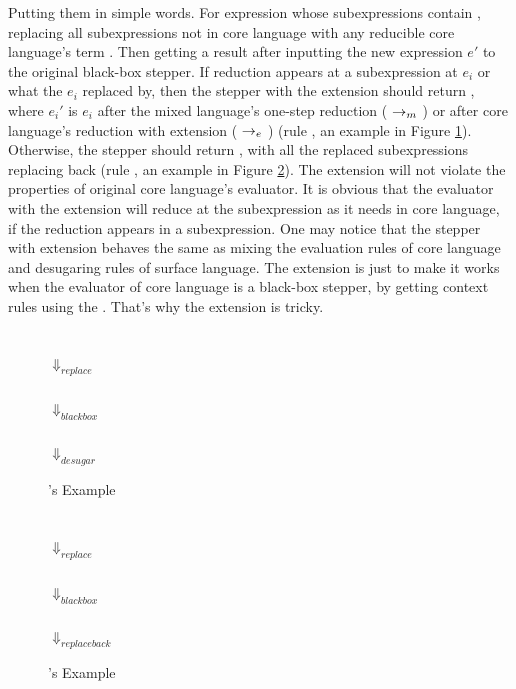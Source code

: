 {Putting them in simple words. For expression  whose subexpressions contain , replacing all  subexpressions not in core language with any reducible core language's term . Then getting a result after inputting the new expression $e'$ to the original black-box stepper. If reduction appears at a subexpression at $e_i$ or what the $e_i$ replaced by, then the stepper with the extension should return , where $e_i'$ is $e_i$ after the mixed language's one-step reduction ($~\rightarrow_m~$) or after core language's reduction with extension ($~\rightarrow_e~$) (rule , an example in Figure \ref{fig:e1}). Otherwise, the stepper should return , with all the replaced subexpressions replacing back (rule , an example in Figure \ref{fig:e2}). The extension will not violate the properties of original core language's evaluator. It is obvious that the evaluator with the extension will reduce at the subexpression as it needs in core language, if the reduction appears in a subexpression. One may notice that the stepper with extension behaves the same as mixing the evaluation rules of core language and desugaring rules of surface language. The extension is just to make it works when the evaluator of core language is a black-box stepper, by getting context rules using the . That's why the extension is tricky.

\begin{center}
\begin{figure}[thb]
\centering
{}\\ $\Downarrow_{replace}$\\ \\ $\Downarrow_{blackbox}$\\ \\ $\Downarrow_{desugar}$\\ 
\caption{'s Example}
\label{fig:e1}
\end{figure}

\begin{figure}[thb]
\centering
{}\\ $\Downarrow_{replace}$ \\\\ $\Downarrow_{blackbox}$\\  \\ $\Downarrow_{replaceback}$\\ 
\caption{'s Example}
\label{fig:e2}
\end{figure}



\end{center}}
